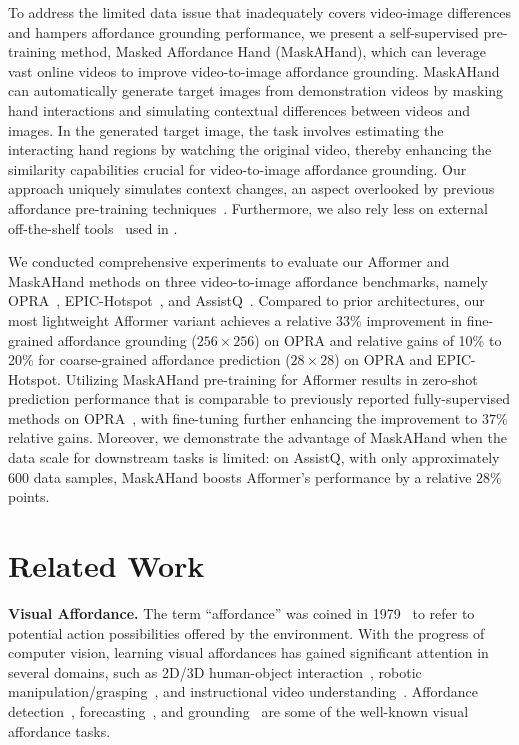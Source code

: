 \documentclass[10pt,twocolumn,letterpaper]{article}
\begin{document}
To address the limited data issue that inadequately covers video-image differences and hampers affordance grounding performance, we present a self-supervised pre-training method, Masked Affordance Hand (MaskAHand), which can leverage vast online videos to improve video-to-image affordance grounding. MaskAHand can automatically generate target images from demonstration videos by masking hand interactions and simulating contextual differences between videos and images. In the generated target image, the task involves estimating the interacting hand regions by watching the original video, thereby enhancing the similarity capabilities crucial for video-to-image affordance grounding. Our approach uniquely simulates context changes, an aspect overlooked by previous affordance pre-training techniques~\cite{jointhand,probes}. Furthermore, we also rely less on external off-the-shelf tools~\cite{100doh,sift,cvzone,skinseg} used in \cite{jointhand,probes}.

We conducted comprehensive experiments to evaluate our Afformer and MaskAHand methods on three video-to-image affordance benchmarks, namely OPRA~\cite{demo2vec}, EPIC-Hotspot~\cite{hotspot}, and AssistQ~\cite{assistq}. Compared to prior architectures, our most lightweight Afformer variant achieves a relative $33\%$ improvement in fine-grained affordance grounding ($256\times256$) on OPRA and relative gains of 10\% to 20\% for coarse-grained affordance prediction ($28\times28$) on OPRA and EPIC-Hotspot. Utilizing MaskAHand pre-training for Afformer results in zero-shot prediction performance that is comparable to previously reported fully-supervised methods on OPRA~\cite{demo2vec}, with fine-tuning further enhancing the improvement to $37\%$ relative gains. Moreover, we demonstrate the advantage of MaskAHand when the data scale for downstream tasks is limited: on AssistQ, with only approximately 600 data samples, MaskAHand boosts Afformer's performance by a relative $28\%$ points.

\section{Related Work}

\noindent\textbf{Visual Affordance.} The term ``affordance'' was coined in 1979~\cite{affordance1979} to refer to potential action possibilities offered by the environment. With the progress of computer vision, learning visual affordances has gained significant attention in several domains, such as 2D/3D human-object interaction~\cite{affonet,3daffonet,graph_affo,100doh}, robotic manipulation/grasping~\cite{affo4robot_survey,dexaffo,dexvip}, and instructional video understanding~\cite{demo2vec,hotspot}. Affordance detection~\cite{oneshot_affo,affonet}, forecasting~\cite{jointhand,nextactive,forecast_hoi}, and grounding~\cite{hotspot,hagnet,probes,exoaffo,demo2vec} are some of the well-known visual affordance tasks.
\end{document}
